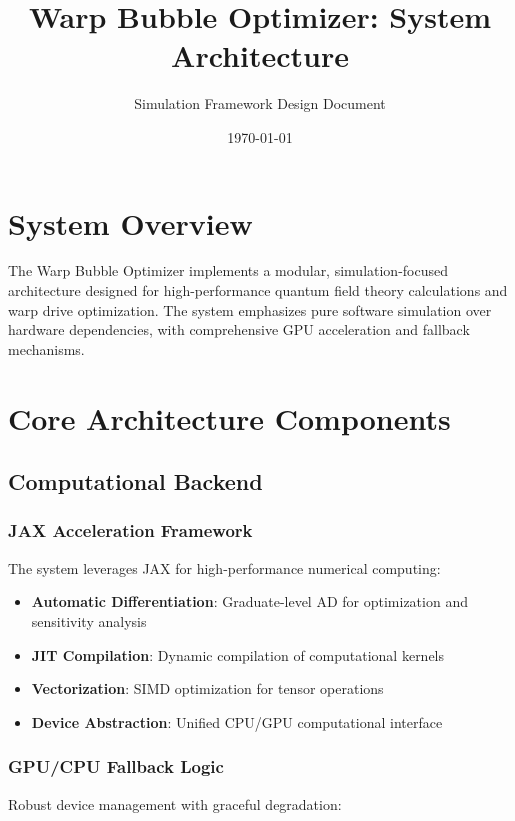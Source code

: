 \documentclass{article}
\title{Warp Bubble Optimizer: System Architecture}
\author{Simulation Framework Design Document}
\date{\today}
\begin{document}
\maketitle

\section{System Overview}

The Warp Bubble Optimizer implements a modular, simulation-focused architecture designed for high-performance quantum field theory calculations and warp drive optimization. The system emphasizes pure software simulation over hardware dependencies, with comprehensive GPU acceleration and fallback mechanisms.

\section{Core Architecture Components}

\subsection{Computational Backend}

\subsubsection{JAX Acceleration Framework}

The system leverages JAX for high-performance numerical computing:

\begin{itemize}
\item \textbf{Automatic Differentiation}: Graduate-level AD for optimization and sensitivity analysis
\item \textbf{JIT Compilation}: Dynamic compilation of computational kernels
\item \textbf{Vectorization}: SIMD optimization for tensor operations
\item \textbf{Device Abstraction}: Unified CPU/GPU computational interface
\end{itemize}

\subsubsection{GPU/CPU Fallback Logic}

Robust device management with graceful degradation:
\end{document}
